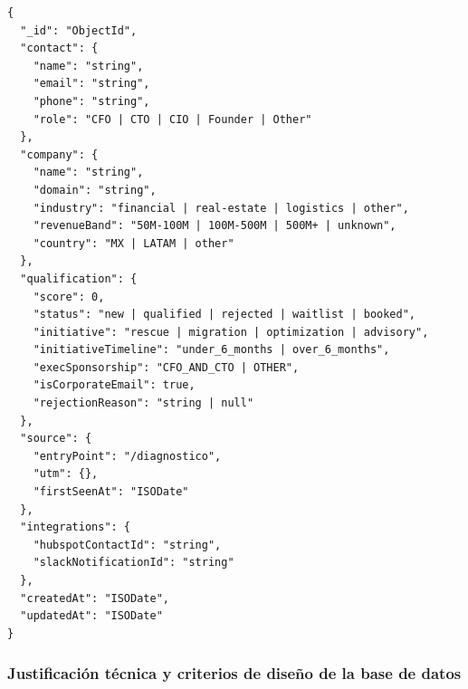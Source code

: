 \documentclass[11pt,letterpaper]{article}
\begin{document}
\begin{Verbatim}[fontsize=\small, breaklines=true]
{
  "_id": "ObjectId",
  "contact": {
    "name": "string",
    "email": "string",
    "phone": "string",
    "role": "CFO | CTO | CIO | Founder | Other"
  },
  "company": {
    "name": "string",
    "domain": "string",
    "industry": "financial | real-estate | logistics | other",
    "revenueBand": "50M-100M | 100M-500M | 500M+ | unknown",
    "country": "MX | LATAM | other"
  },
  "qualification": {
    "score": 0,
    "status": "new | qualified | rejected | waitlist | booked",
    "initiative": "rescue | migration | optimization | advisory",
    "initiativeTimeline": "under_6_months | over_6_months",
    "execSponsorship": "CFO_AND_CTO | OTHER",
    "isCorporateEmail": true,
    "rejectionReason": "string | null"
  },
  "source": {
    "entryPoint": "/diagnostico",
    "utm": {},
    "firstSeenAt": "ISODate"
  },
  "integrations": {
    "hubspotContactId": "string",
    "slackNotificationId": "string"
  },
  "createdAt": "ISODate",
  "updatedAt": "ISODate"
}
\end{Verbatim}

\subsubsection{Justificación técnica y criterios de diseño de la base de datos}
\end{document}
